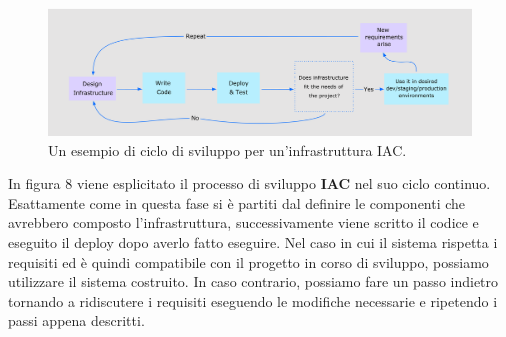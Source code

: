 \documentclass[a4paper,12pt]{report}
\begin{document}
\begin{figure}[h]
	\includegraphics[width=1.0\textwidth]{iac_workflow}
    \caption{Un esempio di ciclo di sviluppo per un'infrastruttura IAC.\cite{iac_img_workflow}}
    \label{fig:push_modifica}
\end{figure}
\newline In figura 8 viene esplicitato il processo di sviluppo \textbf{IAC} nel suo ciclo continuo. Esattamente come in questa fase si è partiti dal definire le componenti che avrebbero composto l'infrastruttura, successivamente viene scritto il codice e eseguito il deploy dopo averlo fatto eseguire. Nel caso in cui il sistema rispetta i requisiti ed è quindi compatibile con il progetto in corso di sviluppo, possiamo utilizzare il sistema costruito. In caso contrario, possiamo fare un passo indietro tornando a ridiscutere i requisiti eseguendo le modifiche necessarie e ripetendo i passi appena descritti.\\ \\ \\ \\ \\ \\ \\
\end{document}
